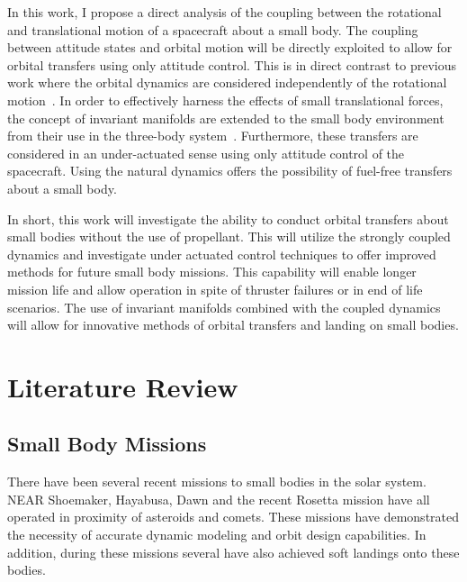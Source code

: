 \documentclass[11pt]{article} %
\begin{document}

In this work, I propose a direct analysis of the coupling between the rotational and translational motion of a spacecraft about a small body. 
The coupling between attitude states and orbital motion will be directly exploited to allow for orbital transfers using only attitude control.
This is in direct contrast to previous work where the orbital dynamics are considered independently of the rotational motion~\cite{kubota2003,antreasian2002}.
In order to effectively harness the effects of small translational forces, the concept of invariant manifolds are extended to the small body environment from their use in the three-body system~\cite{koon2000}. 
Furthermore, these transfers are considered in an under-actuated sense using only attitude control of the spacecraft.
Using the natural dynamics offers the possibility of fuel-free transfers about a small body.

In short, this work will investigate the ability to conduct orbital transfers about small bodies without the use of propellant.
This will utilize the strongly coupled dynamics and investigate under actuated control techniques to offer improved methods for future small body missions.
This capability will enable longer mission life and allow operation in spite of thruster failures or in end of life scenarios.
The use of invariant manifolds combined with the coupled dynamics will allow for innovative methods of orbital transfers and landing on small bodies.

%
%
%
%

\section{Literature Review}

\subsection{Small Body Missions}
There have been several recent missions to small bodies in the solar system.
NEAR Shoemaker, Hayabusa, Dawn and the recent Rosetta mission have all operated in proximity of asteroids and comets.
These missions have demonstrated the necessity of accurate dynamic modeling and orbit design capabilities.
In addition, during these missions several have also achieved soft landings onto these bodies. 
\end{document}
